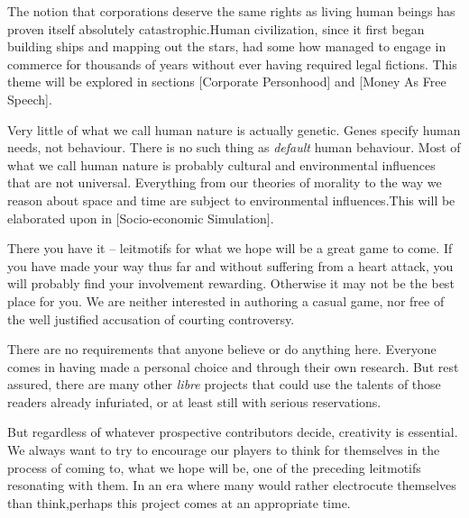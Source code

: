 
The notion that corporations deserve the same rights as living human beings has proven itself absolutely catastrophic. Human civilization, since it first began building ships and mapping out the stars, had some how managed to engage in commerce for thousands of years without ever having required legal fictions. This theme will be explored in sections \in{}[Corporate Personhood] and \in{}[Money As Free Speech].


Very little of what we call human nature is actually genetic. Genes specify human needs, not behaviour. There is no such thing as {\it default} human behaviour. Most of what we call human nature is probably cultural and environmental influences that are not universal. Everything from our theories of morality to the way we reason about space and time are subject to environmental influences.\footnotecite[henrich2010] This will be elaborated upon in [Socio-economic Simulation].
\stopitemize

There you have it -- leitmotifs for what we hope will be a great game to come. If you have made your way thus far and without suffering from a heart attack, you will probably find your involvement rewarding. Otherwise it may not be the best place for you. We are neither interested in authoring a casual game, nor free of the well justified accusation of courting controversy.

There are no requirements that anyone believe or do anything here. Everyone comes in having made a personal choice and through their own research. But rest assured, there are many other {\it libre} projects that could use the talents of those readers already infuriated, or at least still with serious reservations.

But regardless of whatever prospective contributors decide, creativity is essential. We always want to try to encourage our players to think for themselves in the process of coming to, what we hope will be, one of the preceding leitmotifs resonating with them. In an era where many would rather electrocute themselves than think, perhaps this project comes at an appropriate time.

\StopChapter

